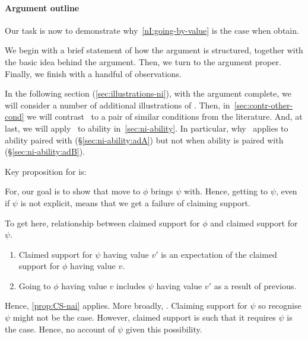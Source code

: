 \paragraph*{Argument outline}

\begin{note}
  Our task is now to demonstrate why~\ref{nI:going-by-value} is the case when \nIBackground{} obtain.

  We begin with a brief statement of how the argument is structured, together with the basic idea behind the argument.
  Then, we turn to the argument proper.
  Finally, we finish with a handful of observations.

  In the following section (\ref{sec:illustrations-ni}), with the argument complete, we will consider a number of additional illustrations of \nI{}.
  Then, in~\ref{sec:contr-other-cond} we will contrast~\nI{} to a pair of similar conditions from the literature.
  And, at last, we will apply~\nI{} to ability in~\autoref{sec:ni-ability}.
  In particular, why~\nI{} applies to ability paired with \adA{} (\S\ref{sec:ni-ability:adA}) but not when ability is paired with \adB{} (\S\ref{sec:ni-ability:adB}).
\end{note}

\begin{note}
  Key proposition for \nI{} is:

  \begin{quote}
    \vspace{-\baselineskip}
    \propCSNai*
  \end{quote}

  For, our goal is to show that move to \(\phi\) brings \(\psi\) with.
  Hence, getting to \(\psi\), even if \(\psi\) is not explicit, means that we get a failure of claiming support.

  To get here, relationship between claimed support for \(\phi\) and claimed support for \(\psi\).

  \begin{enumerate}
  \item Claimed support for \(\psi\) having value \(v'\) is an expectation of the claimed support for \(\phi\) having value \(v\).
  \item Going to \(\phi\) having value \(v\) includes \(\psi\) having value \(v'\) as a result of previous.
  \end{enumerate}
  Hence, \ref{prop:CS-nai} applies.
  More broadly, \eiS{}.
  Claiming support for \(\psi\) so recognise \(\psi\) might not be the case.
  However, claimed support is such that it requires \(\psi\) is the case.
  Hence, no account of \(\psi\) given this possibility.
\end{note}

